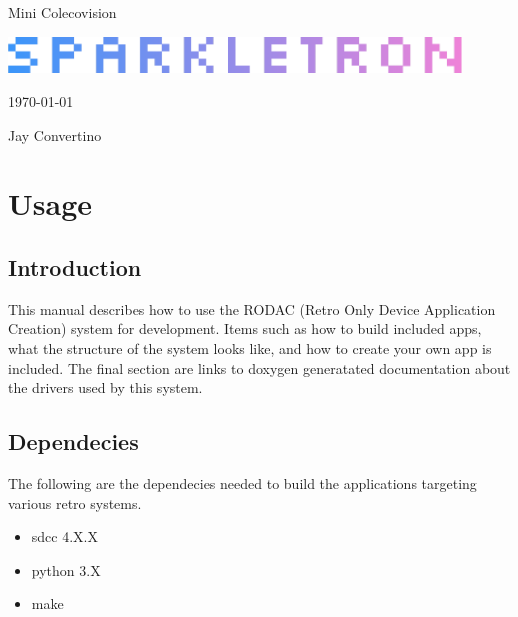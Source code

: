 \begin{titlepage}
  \begin{center}

  {\Huge Mini Colecovision}

  \vspace{25mm}

  \includegraphics[width=0.90\textwidth,height=\textheight,keepaspectratio]{img/SPARKLETRON.png}

  \vspace{25mm}

  \today

  \vspace{15mm}

  {\Large Jay Convertino}

  \end{center}
\end{titlepage}

\tableofcontents

\newpage

\section{Usage}

\subsection{Introduction}

\par
This manual describes how to use the RODAC (Retro Only Device Application Creation) system for development.
Items such as how to build included apps, what the structure of the system looks like, and how to create your
own app is included. The final section are links to doxygen generatated documentation about the drivers used
by this system.

\subsection{Dependecies}

\par
The following are the dependecies needed to build the applications targeting various retro systems.

\begin{itemize}
  \item sdcc 4.X.X
  \item python 3.X
  \item make
\end{itemize}

